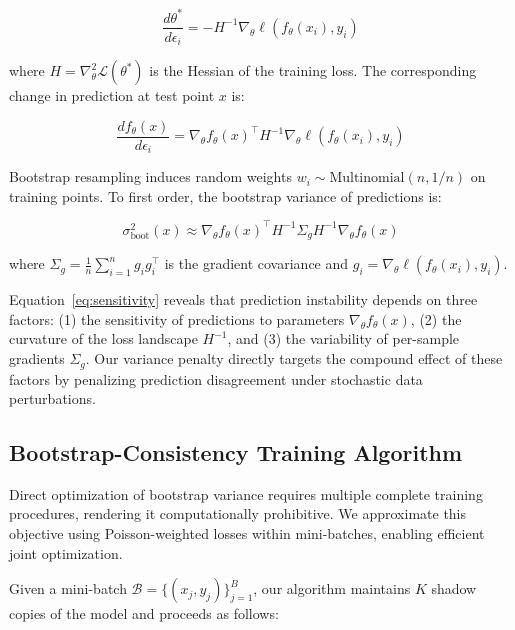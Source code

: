 \documentclass[12pt, letterpaper]{article}
\begin{document}
\begin{equation}
\frac{d\theta^*}{d\epsilon_i} = -H^{-1} \nabla_\theta \ell(f_\theta(x_i), y_i)
\end{equation}

where $H = \nabla^2_\theta \mathcal{L}(\theta^*)$ is the Hessian of the training loss. The corresponding change in prediction at test point $x$ is:

\begin{equation}
\frac{df_\theta(x)}{d\epsilon_i} = \nabla_\theta f_\theta(x)^\top H^{-1} \nabla_\theta \ell(f_\theta(x_i), y_i)
\end{equation}

Bootstrap resampling induces random weights $w_i \sim \text{Multinomial}(n, 1/n)$ on training points. To first order, the bootstrap variance of predictions is:

\begin{equation}
\sigma^2_{\text{boot}}(x) \approx \nabla_\theta f_\theta(x)^\top H^{-1} \Sigma_g H^{-1} \nabla_\theta f_\theta(x)
\label{eq:sensitivity}
\end{equation}

where $\Sigma_g = \frac{1}{n}\sum_{i=1}^n g_i g_i^\top$ is the gradient covariance and $g_i = \nabla_\theta \ell(f_\theta(x_i), y_i)$.

Equation~\eqref{eq:sensitivity} reveals that prediction instability depends on three factors: (1) the sensitivity of predictions to parameters $\nabla_\theta f_\theta(x)$, (2) the curvature of the loss landscape $H^{-1}$, and (3) the variability of per-sample gradients $\Sigma_g$. Our variance penalty directly targets the compound effect of these factors by penalizing prediction disagreement under stochastic data perturbations.

\subsection{Bootstrap-Consistency Training Algorithm}

Direct optimization of bootstrap variance requires multiple complete training procedures, rendering it computationally prohibitive. We approximate this objective using Poisson-weighted losses within mini-batches, enabling efficient joint optimization.

Given a mini-batch $\mathcal{B} = \{(x_j, y_j)\}_{j=1}^B$, our algorithm maintains $K$ shadow copies of the model and proceeds as follows:
\end{document}
